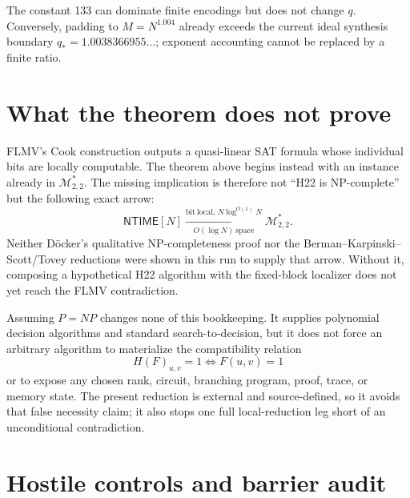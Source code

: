 \documentclass[11pt]{article}
\begin{document}
The constant 133 can dominate finite encodings but does not change $q$.
Conversely, padding to $M=N^{1.004}$ already exceeds the current ideal
synthesis boundary $q_*=1.0038366955\ldots$; exponent accounting cannot be
replaced by a finite ratio.

\section{What the theorem does not prove}

FLMV's Cook construction outputs a quasi-linear SAT formula whose individual
bits are locally computable.  The theorem above begins instead with an
instance already in $\mathcal M^{*}_{2,2}$.  The missing implication is
therefore not ``H22 is NP-complete'' but the following exact arrow:
\[
 \mathsf{NTIME}[N]
 \xrightarrow[O(\log N)\ \mathrm{space}]
 {\mathrm{bit\ local},\,N\log^{O(1)}N}
 \mathcal M^{*}_{2,2}.
\]
Neither D\"ocker's qualitative NP-completeness proof nor the Berman--Karpinski--
Scott/Tovey reductions were shown in this run to supply that arrow.  Without
it, composing a hypothetical H22 algorithm with the fixed-block localizer
does not yet reach the FLMV contradiction.

Assuming $P=NP$ changes none of this bookkeeping.  It supplies polynomial
decision algorithms and standard search-to-decision, but it does not force an
arbitrary algorithm to materialize the compatibility relation
\[
 H(F)_{u,v}=1\Longleftrightarrow F(u,v)=1
\]
or to expose any chosen rank, circuit, branching program, proof, trace, or
memory state.  The present reduction is external and source-defined, so it
avoids that false necessity claim; it also stops one full local-reduction leg
short of an unconditional contradiction.

\section{Hostile controls and barrier audit}
\end{document}
